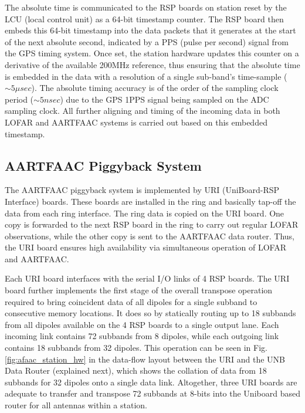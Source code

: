 \documentclass{ws-jai}
\begin{document}
The absolute time is communicated to the  RSP boards on station reset by the LCU
(local control  unit) as a 64-bit  timestamp counter. The RSP  board then embeds
this 64-bit timestamp  into the data packets  that it generates at  the start of
the next absolute second, indicated by a  PPS (pulse per second) signal from the
GPS timing  system.  Once set,  the station hardware  updates this counter  on a
derivative of  the available 200MHz  reference, thus ensuring that  the absolute
time  is  embedded  in  the  data  with a  resolution  of  a  single  sub-band's
time-sample ($\sim5\mu  sec$). The absolute timing  accuracy is of the  order of
the sampling clock period ($\sim5nsec$) due to the GPS 1PPS signal being sampled
on the ADC sampling clock.  All further aligning and timing of the incoming data
in  both LOFAR  and  AARTFAAC systems  is  carried out  based  on this  embedded
timestamp.

\subsection {AARTFAAC Piggyback System}
The AARTFAAC  piggyback system  is implemented by URI  (UniBoard-RSP Interface)
boards. These  boards are installed in  the ring and basically  tap-off the data
from each ring interface. The ring data is  copied on the URI board. One copy is
forwarded  to  the next  RSP  board  in the  ring  to  carry out  regular  LOFAR
observations, while  the other copy is  sent to the AARTFAAC  data router. Thus,
the URI board ensures high availability  via simultaneous operation of LOFAR and
AARTFAAC.

Each URI board  interfaces with the serial  I/O links of 4 RSP  boards.  The URI
board  further implements  the first  stage of  the overall  transpose operation
required  to bring  coincident  data of  all  dipoles for  a  single subband  to
consecutive  memory locations.   It  does  so by  statically  routing  up to  18
subbands from all dipoles available on the 4 RSP boards to a single output lane.
Each incoming link contains 72 subbands from 8 dipoles, while each outgoing link
contains  18  subbands  from  32  dipoles.    This  operation  can  be  seen  in
Fig. \ref{fig:afaac_station_hw} in the data-flow  layout between the URI and the
UNB Data  Router (explained  next), which  shows the collation  of data  from 18
subbands for 32  dipoles onto a single data link.   Altogether, three URI boards
are adequate to  transfer and transpose 72 subbands at  8-bits into the Uniboard
based router for all antennas within a station.\\
\end{document}

